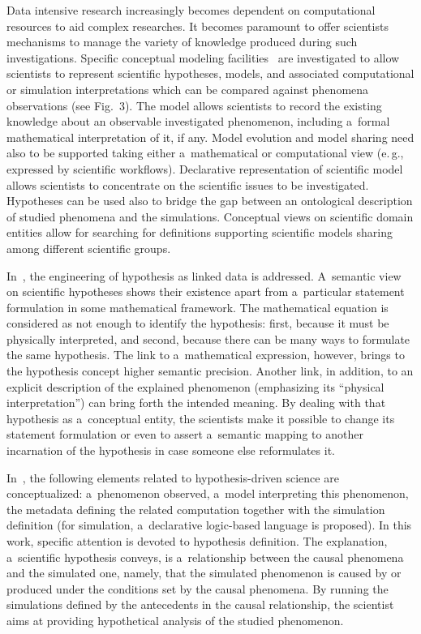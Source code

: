 \begin{multicols}{2}
  \noindent
  Data intensive research increasingly becomes dependent on computational resources to aid complex
researches. It becomes paramount to offer scientists mechanisms to manage the
variety of knowledge produced during such investigations. Specific conceptual
modeling facilities~\cite{43-kl} are investigated to allow scientists to represent
scientific hypotheses, models, and associated computational or simulation
interpretations which can be compared against phenomena observations (see Fig.~3). The model allows scientists to record the existing knowledge about an observable
investigated phenomenon, including a~formal mathematical interpretation of it, if any.
Model evolution and model sharing need also to be supported taking either a~mathematical or computational view (e.\,g., expressed by scientific workflows).
Declarative representation of scientific model allows scientists to concentrate on the
scientific issues to be investigated. Hypotheses can be used also to bridge the gap between an ontological description of studied phenomena and the simulations.
Conceptual views on scientific domain entities allow for searching for definitions supporting scientific models sharing among different scientific groups.

  In~\cite{11-kl}, the engineering of hypothesis as linked data is addressed.
A~semantic view on scientific hypotheses shows their existence apart from a~particular statement formulation in some mathematical framework. The mathematical
equation is considered as not enough to identify the hypothesis: first,
because it must be physically interpreted, and second, because there can be many
ways to formulate the  same hypothesis. The link to a~mathematical expression,
however, brings to the  hypothesis concept higher semantic precision.
Another link, in addition, to an explicit  description of the explained
phenomenon (emphasizing its ``physical interpretation'')  can bring forth the
intended meaning. By dealing with that hypothesis as a~conceptual  entity,
the scientists make it possible to change its statement formulation or even
to  assert a~semantic mapping to another incarnation of the hypothesis in
case someone  else reformulates it.

  In~\cite{43-kl}, the following elements related to hypothesis-driven science are
conceptualized: a~phenomenon observed, a~model interpreting this phenomenon, the
metadata defining the related computation together with the simulation definition
(for
simulation, a~declarative logic-based language is proposed).
In this work, specific attention is devoted to hypothesis definition.
The explanation, a~scientific hypothesis  conveys, is a~relationship between the causal phenomena and the simulated one,
namely, that the simulated phenomenon is caused by or produced under the
conditions set by the causal phenomena. By running the simulations defined by the antecedents in the causal relationship, the scientist aims at providing hypothetical  analysis of the studied phenomenon.


\end{multicols}
